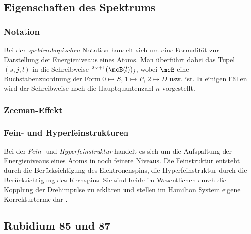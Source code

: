 \documentclass[../main.tex]{subfiles}
\begin{document}
    \subsection{Eigenschaften des Spektrums}
        \subsubsection*{Notation}
            Bei der \emph{spektroskopischen} Notation handelt sich um eine Formalität zur Darstellung der Energieniveaus eines Atoms. Man überführt dabei das Tupel $(s,j,l)$ in die Schreibweise $^{2\cdot s + 1}(\mcB(l))_j$, wobei $\mcB$ eine Buchstabenzuordnung der Form $0\mapsto S$, $1\mapsto P$, $2\mapsto D$ usw. ist. In einigen Fällen wird der Schreibweise noch die Hauptquantenzahl $n$ vorgestellt.

        \subsubsection*{Zeeman-Effekt}


			

        \subsubsection*{Fein- und Hyperfeinstrukturen}
            Bei der \emph{Fein-} und \emph{Hyperfeinstruktur} handelt es sich um die Aufspaltung der Energieniveaus eines Atoms in noch feinere Niveaus. Die Feinstruktur entsteht durch die Berücksichtigung des Elektronenspins, die Hyperfeinstruktur durch die Berücksichtigung des Kernspins. Sie sind beide im Wesentlichen durch die Kopplung der Drehimpulse zu erklären und stellen im Hamilton System eigene Korrekturterme dar \cite[p.203f, p.379ff]{HakenWolf}.

    \subsection{Rubidium 85 und 87}
        
\end{document}
